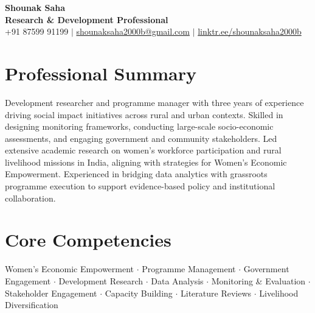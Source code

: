 ﻿\documentclass[11pt,a4paper]{article}
\begin{document}
\begin{center}
    {\huge \textbf{Shounak Saha}} \\ \vspace{1ex}
    \textbf{Research & Development Professional} \\ \vspace{0.5ex}
    \small +91 87599 91199 $|$ \href{mailto:shounaksaha2000b@gmail.com}{shounaksaha2000b@gmail.com} $|$ \href{https://linktr.ee/shounaksaha2000b}{linktr.ee/shounaksaha2000b}
\end{center}

\section*{Professional Summary}
\small{Development researcher and programme manager with three years of experience driving social impact initiatives across rural and urban contexts. Skilled in designing monitoring frameworks, conducting large-scale socio-economic assessments, and engaging government and community stakeholders. Led extensive academic research on women's workforce participation and rural livelihood missions in India, aligning with strategies for Women's Economic Empowerment. Experienced in bridging data analytics with grassroots programme execution to support evidence-based policy and institutional collaboration.}

\section*{Core Competencies}
\small{Women's Economic Empowerment $\cdot$ Programme Management $\cdot$ Government Engagement $\cdot$ Development Research $\cdot$ Data Analysis $\cdot$ Monitoring \& Evaluation $\cdot$ Stakeholder Engagement $\cdot$ Capacity Building $\cdot$ Literature Reviews $\cdot$ Livelihood Diversification}

\end{document}
